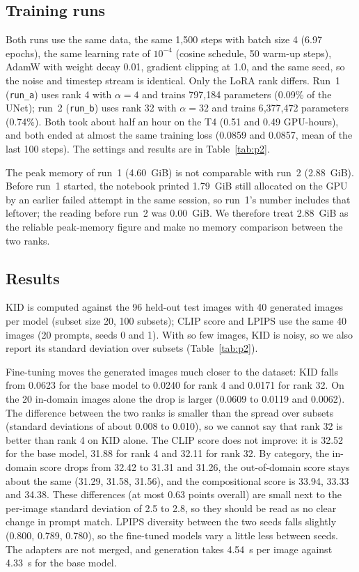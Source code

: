 \subsection{Training runs}
Both runs use the same data, the same 1{,}500 steps with batch size 4 (6.97 epochs), the same learning rate of $10^{-4}$ (cosine schedule, 50 warm-up steps), AdamW with weight decay 0.01, gradient clipping at 1.0, and the same seed, so the noise and timestep stream is identical. Only the LoRA rank differs. Run~1 (\texttt{run\_a}) uses rank 4 with $\alpha=4$ and trains 797{,}184 parameters (0.09\% of the UNet); run~2 (\texttt{run\_b}) uses rank 32 with $\alpha=32$ and trains 6{,}377{,}472 parameters (0.74\%). Both took about half an hour on the T4 (0.51 and 0.49 GPU-hours), and both ended at almost the same training loss (0.0859 and 0.0857, mean of the last 100 steps). The settings and results are in Table~\ref{tab:p2}.

The peak memory of run~1 (4.60~GiB) is not comparable with run~2 (2.88~GiB). Before run~1 started, the notebook printed 1.79~GiB still allocated on the GPU by an earlier failed attempt in the same session, so run~1's number includes that leftover; the reading before run~2 was 0.00~GiB. We therefore treat 2.88~GiB as the reliable peak-memory figure and make no memory comparison between the two ranks.

\subsection{Results}
KID is computed against the 96 held-out test images with 40 generated images per model (subset size 20, 100 subsets); CLIP score and LPIPS use the same 40 images (20 prompts, seeds 0 and 1). With so few images, KID is noisy, so we also report its standard deviation over subsets (Table~\ref{tab:p2}).

Fine-tuning moves the generated images much closer to the dataset: KID falls from 0.0623 for the base model to 0.0240 for rank 4 and 0.0171 for rank 32. On the 20 in-domain images alone the drop is larger (0.0609 to 0.0119 and 0.0062). The difference between the two ranks is smaller than the spread over subsets (standard deviations of about 0.008 to 0.010), so we cannot say that rank 32 is better than rank 4 on KID alone. The CLIP score does not improve: it is 32.52 for the base model, 31.88 for rank 4 and 32.11 for rank 32. By category, the in-domain score drops from 32.42 to 31.31 and 31.26, the out-of-domain score stays about the same (31.29, 31.58, 31.56), and the compositional score is 33.94, 33.33 and 34.38. These differences (at most 0.63 points overall) are small next to the per-image standard deviation of 2.5 to 2.8, so they should be read as no clear change in prompt match. LPIPS diversity between the two seeds falls slightly (0.800, 0.789, 0.780), so the fine-tuned models vary a little less between seeds. The adapters are not merged, and generation takes 4.54~s per image against 4.33~s for the base model.

